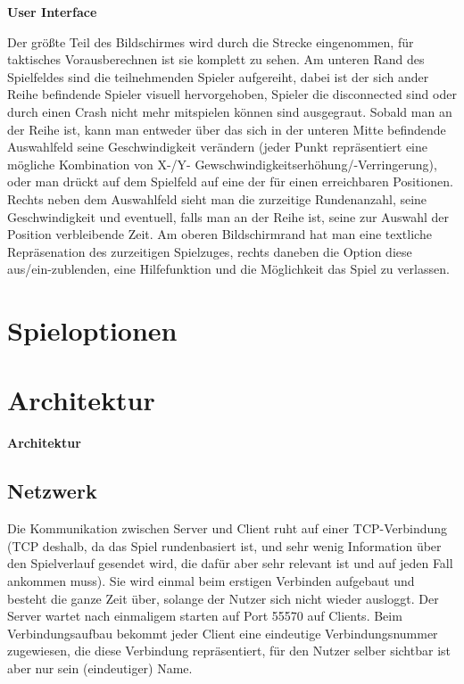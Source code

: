\documentclass[a0, portrait, english, ngerman]{a0poster}
\begin{document}
\begin{multicols}{3}
\begin{center}
	\textbf{User Interface}
\end{center}

Der größte Teil des Bildschirmes wird durch die Strecke eingenommen, für taktisches Vorausberechnen ist sie komplett zu sehen. Am unteren Rand des Spielfeldes sind die teilnehmenden Spieler aufgereiht, dabei ist der sich ander Reihe befindende Spieler visuell hervorgehoben, Spieler die disconnected sind oder durch einen Crash nicht mehr mitspielen können sind ausgegraut. Sobald man an der Reihe ist, kann man entweder über das sich in der unteren Mitte befindende Auswahlfeld seine Geschwindigkeit verändern (jeder Punkt repräsentiert eine mögliche Kombination von X-/Y- Gewschwindigkeitserhöhung/-Verringerung), oder man drückt auf dem Spielfeld auf eine der für einen erreichbaren Positionen. Rechts neben dem Auswahlfeld sieht man die zurzeitige Rundenanzahl, seine Geschwindigkeit und eventuell, falls man an der Reihe ist, seine zur Auswahl der Position verbleibende Zeit. Am oberen Bildschirmrand hat man eine textliche Repräsenation des zurzeitigen Spielzuges, rechts daneben die Option diese aus/ein-zublenden, eine Hilfefunktion und die Möglichkeit das Spiel zu verlassen.\\
\section{Spieloptionen}

\section{Architektur}
\begin{center}
	\textbf{Architektur}
\end{center}
	\subsection{Netzwerk}
    
Die Kommunikation zwischen Server und Client ruht auf einer TCP-Verbindung (TCP deshalb, da das Spiel rundenbasiert ist, und sehr wenig Information über den Spielverlauf gesendet wird, die dafür aber sehr relevant ist und auf jeden Fall ankommen muss). Sie wird einmal beim erstigen Verbinden aufgebaut und besteht die ganze Zeit über, solange der Nutzer sich nicht wieder ausloggt. Der Server wartet nach einmaligem starten auf Port 55570 auf Clients. Beim Verbindungsaufbau bekommt jeder Client eine eindeutige Verbindungsnummer zugewiesen, die diese Verbindung repräsentiert, für den Nutzer selber sichtbar ist aber nur sein (eindeutiger) Name.\\


\end{multicols}
\end{document}
